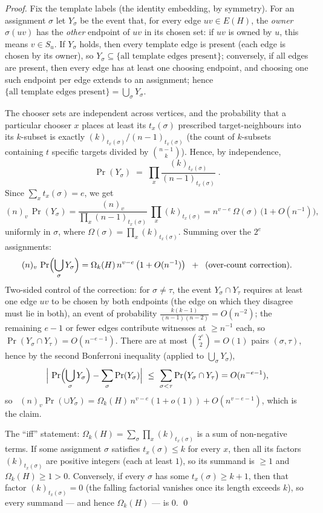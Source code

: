 \documentclass[11pt,a4paper]{article}
\theoremstyle{definition}
\theoremstyle{definition}
\begin{document}
\begin{proof}
Fix the template labels (the identity embedding, by symmetry). For an assignment
$\sigma$ let $Y_\sigma$ be the event that, for every edge $uv \in E(H)$, the
\emph{owner} $\sigma(uv)$ has the \emph{other} endpoint of $uv$ in its chosen set:
if $uv$ is owned by $u$, this means $v\in S_u$. If $Y_\sigma$ holds, then every
template edge is present (each edge is chosen by its owner), so
$Y_\sigma\subseteq\{\text{all template edges present}\}$; conversely, if all edges
are present, then every edge has at least one choosing endpoint, and choosing one
such endpoint per edge extends to an assignment; hence
$\{\text{all template edges present}\}=\bigcup_\sigma Y_\sigma$.

The chooser sets are independent across vertices, and the probability that a
particular chooser $x$ places at least its $t_x(\sigma)$ prescribed target-neighbours
into its $k$-subset is exactly $(k)_{t_x(\sigma)}/(n-1)_{t_x(\sigma)}$
(the count of $k$-subsets containing $t$ specific targets divided by
$\binom{n-1}{k}$). Hence, by independence,
\[
\Pr(Y_\sigma) \;=\;\prod_{x}\frac{(k)_{t_x(\sigma)}}{(n-1)_{t_x(\sigma)}}\;.
\]
Since $\sum_x t_x(\sigma) = e$, we get
\[
(n)_{v}\,\Pr(Y_\sigma) =
\frac{(n)_{v}}{\prod_x (n-1)_{t_x(\sigma)}}\ \prod_x (k)_{t_x(\sigma)}
= n^{v-e}\,\Omega(\sigma)\,\bigl(1+O(n^{-1})\bigr),
\]
uniformly in $\sigma$, where $\Omega(\sigma)=\prod_x (k)_{t_x(\sigma)}$.
Summing over the $2^{e}$ assignments:
\[
(n)_{v}\,\Pr\Bigl(\bigcup_\sigma Y_\sigma\Bigr) = \Omega_k(H)\,n^{v-e}\,\bigl(1+O(n^{-1})\bigr)
\;\;+\;\; \text{(over-count correction)}.
\]
Two-sided control of the correction: for $\sigma\ne\tau$, the event
$Y_\sigma\cap Y_\tau$ requires at least one edge $uv$ to be chosen by both
endpoints (the edge on which they disagree must lie in both), an event of
probability $\frac{k(k-1)}{(n-1)(n-2)}=O(n^{-2})$; the remaining $e-1$ or fewer
edges contribute witnesses at $\ge n^{-1}$ each, so
$\Pr(Y_\sigma\cap Y_\tau) = O(n^{-e-1})$.
There are at most $\binom{2^{e}}{2} = O(1)$ pairs $(\sigma,\tau)$, hence
by the second Bonferroni inequality (applied to $\bigcup_\sigma Y_\sigma$),
\[
\Bigl|\ \Pr\Bigl(\bigcup_\sigma Y_\sigma\Bigr) - \sum_{\sigma}\Pr(Y_\sigma)\Bigr|
\ \le\ \sum_{\sigma<\tau}\Pr\bigl(Y_\sigma\cap Y_\tau\bigr)
= O(n^{-e-1}),
\]
so \ $(n)_v\Pr(\cup Y_\sigma) = \Omega_k(H)\, n^{v-e} (1+o(1)) + O(n^{v-e-1})$,
which is the claim.

The ``iff'' statement: $\Omega_k(H)=\sum_\sigma\prod_x(k)_{t_x(\sigma)}$ is a sum
of non-negative terms. If some assignment $\sigma$ satisfies $t_x(\sigma)\le k$
for every $x$, then all its factors $(k)_{t_x(\sigma)}$ are positive integers
(each at least $1$), so its summand is $\ge 1$ and $\Omega_k(H)\ge 1>0$.
Conversely, if every $\sigma$ has some $t_x(\sigma)\ge k+1$, then that factor
$(k)_{t_x(\sigma)}=0$ (the falling factorial vanishes once its length exceeds
$k$), so every summand — and hence $\Omega_k(H)$ — is $0$. \qed
\end{proof}
\end{document}
